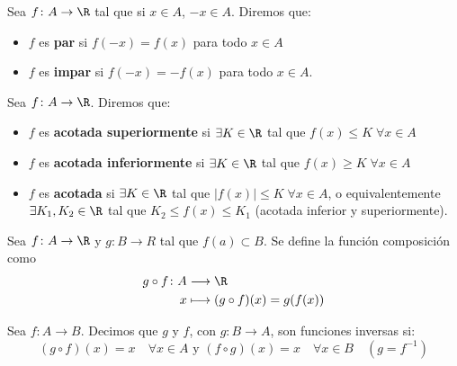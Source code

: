 \begin{proposition}
	Sea \(f \colon A \to \R \) tal que si \(x \in A \), \(-x \in A \). Diremos que:
	\begin{itemize}
		\item \(f \) es \textbf{par}  si \(f(-x) = f(x )\) para todo \(x \in A \)
		\item \(f \) es \textbf{impar}  si \(f(-x) = -f(x )\) para todo \(x \in A \).
	\end{itemize}
\end{proposition}
\begin{definition}
	Sea \(f \colon A \to \R \). Diremos que:
	\begin{itemize}
		\item \(f \) es \textbf{acotada superiormente}  si \(\exists K \in \R \) tal que \(f(x) \leq K \; \forall x \in A \)
		\item \(f \) es \textbf{acotada inferiormente}  si \(\exists K \in \R \) tal que \(f(x) \geq K \; \forall x \in A \)
		\item \(f \) es \textbf{acotada}  si \(\exists K \in \R \) tal que \(|f(x)| \leq K \; \forall x \in A\), o equivalentemente \(\exists K_1,K_2 \in \R \) tal que \(K_2 \leq f(x) \leq K_1 \) (acotada inferior y superiormente).
	\end{itemize}
\end{definition}
\begin{definition}[Composición]
	Sea \(f \colon A \to \R \) y \(g : B \to R \) tal que \(f(a) \subset B \). Se define la función composición como
	\[
		\begin{aligned}
			g \circ f \colon A & \longrightarrow  \R                    \\
			x                  & \longmapsto (g \circ f )(x) = g(f(x))
		\end{aligned}
	\]
\end{definition}
\begin{definition}[Inversa]
	Sea \(f \colon A \to B \). Decimos que \(g \) y \(f \), con \(g \colon B \to A \), son funciones inversas si:
	\[
		(g \circ f)(x) = x \quad \forall x \in A
		\text{ y }
		(f \circ g)(x) = x \quad \forall x \in B \quad (g = f^{-1} )
	\]
\end{definition}

